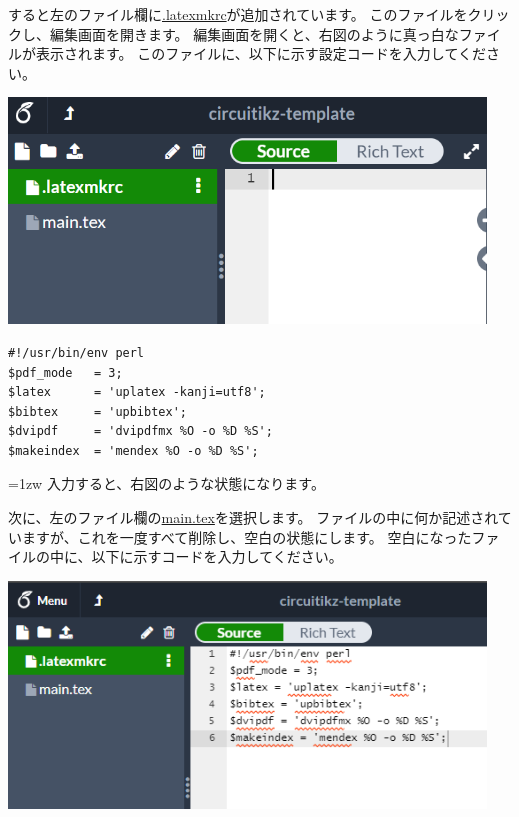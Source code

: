 		\noindent
		\begin{minipage}{0.4\hsize}
			すると左のファイル欄に\url{.latexmkrc}が追加されています。
			このファイルをクリックし、編集画面を開きます。
			編集画面を開くと、右図のように真っ白なファイルが表示されます。
			このファイルに、以下に示す設定コードを入力してください。
		\end{minipage}\hfill
		\begin{minipage}{0.6\hsize}
			\begin{flushright}
				\includegraphics[width=0.95\textwidth]{overleaf-editer-latexmkrc.png}
			\end{flushright}
		\end{minipage}
		
		\begin{mdframed}
			\begin{verbatim}
#!/usr/bin/env perl
$pdf_mode   = 3;
$latex      = 'uplatex -kanji=utf8';
$bibtex     = 'upbibtex';
$dvipdf     = 'dvipdfmx %O -o %D %S';
$makeindex  = 'mendex %O -o %D %S';
				\end{verbatim}
		\end{mdframed}
		
		\noindent
		\begin{minipage}{0.4\hsize}\parindent=1zw
			入力すると、右図のような状態になります。
			
			次に、左のファイル欄の\url{main.tex}を選択します。
			ファイルの中に何か記述されていますが、これを一度すべて削除し、空白の状態にします。
			空白になったファイルの中に、以下に示すコードを入力してください。
		\end{minipage}\hfill
		\begin{minipage}{0.6\hsize}
			\begin{flushright}
				\includegraphics[width=0.95\textwidth]{overleaf-text-latexmkrc.png}
			\end{flushright}
		\end{minipage}
		
